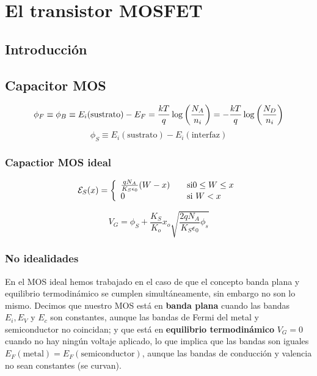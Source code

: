 \chapter{El transistor MOSFET}

\section{Introducción}

\lipsum[1]

\section{Capacitor MOS}


\lipsum[1-2]

\begin{equation*}
	\phi_F \equiv \phi_B \equiv E_i(\text{sustrato}) - E_F 
    = \frac{kT}{q} \log \left( \frac{N_A}{n_i} \right) = -\frac{kT}{q} \log \left( \frac{N_D}{n_i} \right) 
\end{equation*}
\begin{equation*}
	\phi_S \equiv E_i(\text{sustrato}) - E_i (\text{interfaz}) 
\end{equation*}

\subsection{Capactior MOS ideal}

\lipsum[1-2]




\begin{equation*}
	\mathcal{E}_S (x) = \left\lbrace \begin{array}{ll}
		\frac{qN_A}{K_S \epsilon_0} (W-x) & \quad \text{si} 0\leq W \leq x \\
		0 & \quad \text{si} \ W<x 
	\end{array} \right.
\end{equation*}



\begin{equation*}
	V_G = \phi_S + \frac{K_S}{K_o} x_o \sqrt{\frac{2qN_A}{K_S\epsilon_0} \phi_s}
\end{equation*}

\subsection{No idealidades}

En el MOS ideal hemos trabajado en el caso de que el concepto banda plana y equilibrio termodinámico se cumplen simultáneamente, sin embargo no son lo mismo. Decimos que nuestro MOS está en \textbf{banda plana} cuando las bandas $E_i,E_V$ y $E_c$ son constantes, aunque las bandas de Fermi del metal y semiconductor no coincidan; y que está en \textbf{equilibrio termodinámico} $V_G=0$ cuando no hay ningún voltaje aplicado, lo que implica que las bandas son iguales $E_F(\text{metal}) = E_F(\text{semiconductor})$, aunque las bandas de conducción y valencia no sean constantes (se curvan).

